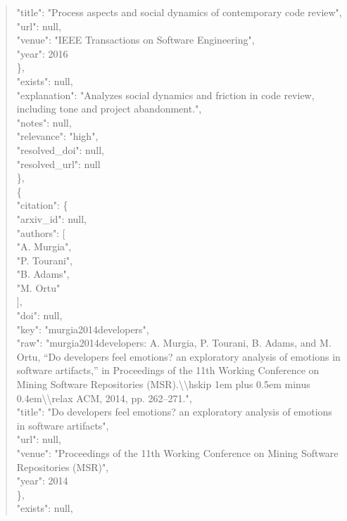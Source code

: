 \documentclass[11pt]{article}
\begin{document}
\begin{quote}
        "title": "Process aspects and social dynamics of contemporary code review",\\
        "url": null,\\
        "venue": "IEEE Transactions on Software Engineering",\\
        "year": 2016\\
      \},\\
      "exists": null,\\
      "explanation": "Analyzes social dynamics and friction in code review, including tone and project abandonment.",\\
      "notes": null,\\
      "relevance": "high",\\
      "resolved\_doi": null,\\
      "resolved\_url": null\\
    \},\\
    \{\\
      "citation": \{\\
        "arxiv\_id": null,\\
        "authors": [\\
          "A. Murgia",\\
          "P. Tourani",\\
          "B. Adams",\\
          "M. Ortu"\\
        ],\\
        "doi": null,\\
        "key": "murgia2014developers",\\
        "raw": "murgia2014developers: A. Murgia, P. Tourani, B. Adams, and M. Ortu, ``Do developers feel emotions? an exploratory analysis of emotions in software artifacts,'' in Proceedings of the 11th Working Conference on Mining Software Repositories (MSR).\textbackslash{}\textbackslash{}hskip 1em plus 0.5em minus 0.4em\textbackslash{}\textbackslash{}relax ACM, 2014, pp. 262--271.",\\
        "title": "Do developers feel emotions? an exploratory analysis of emotions in software artifacts",\\
        "url": null,\\
        "venue": "Proceedings of the 11th Working Conference on Mining Software Repositories (MSR)",\\
        "year": 2014\\
      \},\\
      "exists": null,\\

\end{quote}
\end{document}

